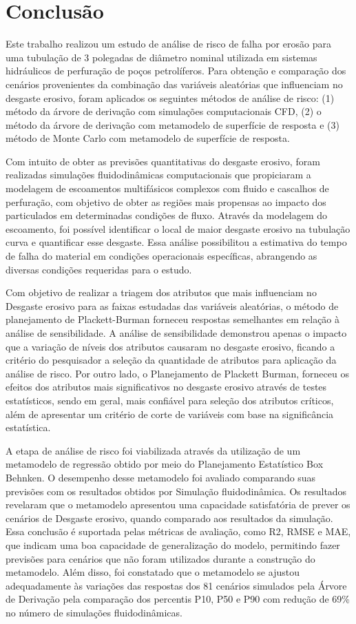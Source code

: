 \chapter{Conclusão}

Este trabalho realizou um estudo de análise de risco de falha por erosão para uma tubulação de 3 polegadas de diâmetro nominal utilizada em sistemas hidráulicos de perfuração de poços petrolíferos. 
Para obtenção e comparação dos cenários provenientes da combinação das variáveis aleatórias que influenciam no desgaste erosivo, foram aplicados os seguintes métodos de análise de risco: (1) método da árvore de derivação com simulações computacionais CFD, (2) o método da árvore de derivação com metamodelo de superfície de resposta e (3) método de Monte Carlo com metamodelo de superfície de resposta.

Com intuito de obter as previsões quantitativas do desgaste erosivo, foram realizadas simulações fluidodinâmicas computacionais que propiciaram a modelagem de escoamentos multifásicos complexos com fluido e cascalhos de perfuração, com objetivo de obter as regiões mais propensas ao impacto dos particulados em determinadas condições de fluxo. Através da modelagem do escoamento, foi possível identificar o local de maior desgaste erosivo na tubulação curva e quantificar esse desgaste. Essa análise possibilitou a estimativa do tempo de falha do material em condições operacionais específicas, abrangendo as diversas condições requeridas para o estudo.

Com objetivo de realizar a triagem dos atributos que mais influenciam no Desgaste erosivo para as faixas estudadas das variáveis aleatórias, o método de planejamento de Plackett-Burman forneceu respostas semelhantes em relação à análise de sensibilidade. A análise de sensibilidade demonstrou apenas o impacto que a variação de níveis dos atributos causaram no desgaste erosivo, ficando a critério do pesquisador a seleção da quantidade de atributos para aplicação da análise de risco. Por outro lado, o Planejamento de Plackett Burman, forneceu os efeitos dos atributos mais significativos no desgaste erosivo através de testes estatísticos, sendo em geral, mais confiável para seleção dos atributos críticos, além de apresentar um critério de corte de variáveis com base na significância estatística.

A etapa de análise de risco foi viabilizada através da utilização de um metamodelo de regressão obtido por meio do Planejamento Estatístico Box Behnken. O desempenho desse metamodelo foi avaliado comparando suas previsões com os resultados obtidos por Simulação fluidodinâmica. Os resultados revelaram que o metamodelo apresentou uma capacidade satisfatória de prever os cenários de Desgaste erosivo, quando comparado aos resultados da simulação. Essa conclusão é suportada pelas métricas de avaliação, como R2, RMSE e MAE, que indicam uma boa capacidade de generalização do modelo, permitindo fazer previsões para cenários que não foram utilizados durante a construção do metamodelo. Além disso, foi constatado que o metamodelo se ajustou adequadamente às variações das respostas dos 81 cenários simulados pela Árvore de Derivação pela comparação dos percentis P10, P50 e P90 com redução de 69\% no número de simulações fluidodinâmicas. 

